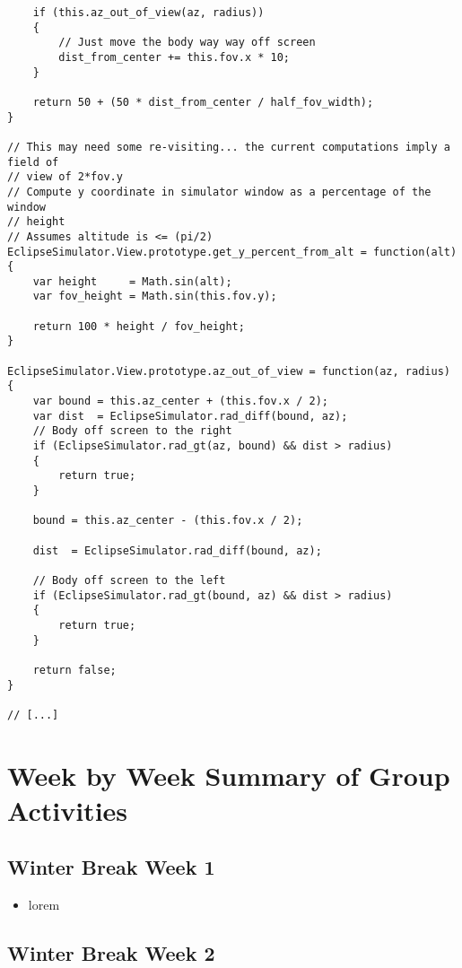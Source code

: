\documentclass[10pt, onecolumn, draftclsnofoot, letterpaper, compsoc]{IEEEtran}
\begin{document}
\begin{verbatim}
    if (this.az_out_of_view(az, radius))
    {
        // Just move the body way way off screen
        dist_from_center += this.fov.x * 10;
    }

    return 50 + (50 * dist_from_center / half_fov_width);
}

// This may need some re-visiting... the current computations imply a field of
// view of 2*fov.y
// Compute y coordinate in simulator window as a percentage of the window
// height
// Assumes altitude is <= (pi/2)
EclipseSimulator.View.prototype.get_y_percent_from_alt = function(alt)
{
    var height     = Math.sin(alt);
    var fov_height = Math.sin(this.fov.y);

    return 100 * height / fov_height;
}

EclipseSimulator.View.prototype.az_out_of_view = function(az, radius)
{
    var bound = this.az_center + (this.fov.x / 2);
    var dist  = EclipseSimulator.rad_diff(bound, az);
    // Body off screen to the right
    if (EclipseSimulator.rad_gt(az, bound) && dist > radius)
    {
        return true;
    }

    bound = this.az_center - (this.fov.x / 2);

    dist  = EclipseSimulator.rad_diff(bound, az);

    // Body off screen to the left
    if (EclipseSimulator.rad_gt(bound, az) && dist > radius)
    {
        return true;
    }

    return false;
}

// [...]
\end{verbatim}

\section{Week by Week Summary of Group Activities}

\subsection{Winter Break Week 1}

    \begin{itemize}

    \item lorem

    \end{itemize}

\subsection{Winter Break Week 2}
\end{document}
